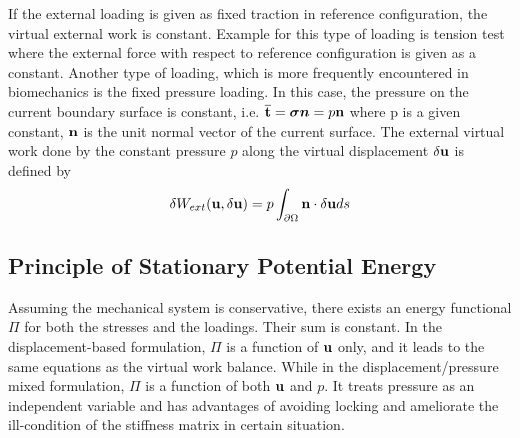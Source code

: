 If the external loading is given as fixed traction in reference configuration, the virtual external work is constant. Example for this type of loading is tension test where the external force with respect to reference configuration is given as a constant. Another type of loading, which is more frequently encountered in biomechanics is the fixed pressure loading.
In this case, the pressure on the current boundary surface is constant, i.e. $\overline{\bold{t}} = \boldsymbol{\sigma{n}} = p\bold{n}$ where p is a given constant, $\bold{n}$ is the unit normal vector of the current surface. The external virtual work done by the constant pressure $p$ along the virtual displacement $\delta{\bold{u}}$ is defined by
\begin{equation} \label{Wext2}
\delta{W_{ext}}(\bold{u}, \delta{\bold{u}}) = p\int_{\partial\Omega} \bold{n}\cdot\delta{\bold{u}}ds
\end{equation}

%
\subsection{Principle of Stationary Potential Energy}
Assuming the mechanical system is conservative, there exists an energy functional $\Pi$ for both the stresses and the loadings. Their sum is constant. In the displacement-based formulation, $\Pi$ is a function of $\bold{u}$ only, and it leads to the same equations as the virtual work balance. While in the displacement/pressure mixed formulation, $\Pi$ is a function of both $\bold{u}$ and $p$. It treats pressure as an independent variable and has advantages of avoiding locking and ameliorate the ill-condition of the stiffness matrix in certain situation.

